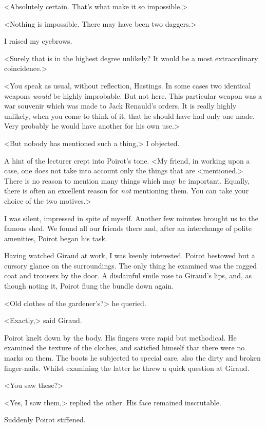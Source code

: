  <Absolutely certain. That's what make it so impossible.> 

 <Nothing is impossible. There may have been two daggers.> 

 I raised my eyebrows. 

 <Surely that is in the highest degree unlikely? It would be a most extraordinary coincidence.> 

 <You speak as usual, without reflection, Hastings. In some cases two identical weapons \emph{would} be highly improbable. But not here. This particular weapon was a war souvenir which was made to Jack Renauld's orders. It is really highly unlikely, when you come to think of it, that he should have had only one made. Very probably he would have another for his own use.> 

 <But nobody has mentioned such a thing,> I objected. 

 A hint of the lecturer crept into Poirot's tone. <My friend, in working upon a case, one does not take into account only the things that are <mentioned.> There is no reason to mention many things which may be important. Equally, there is often an excellent reason for \emph{not} mentioning them. You can take your choice of the two motives.> 

 I was silent, impressed in spite of myself. Another few minutes brought us to the famous shed. We found all our friends there and, after an interchange of polite amenities, Poirot began his task. 

 Having watched Giraud at work, I was keenly interested. Poirot bestowed but a cursory glance on the surroundings. The only thing he examined was the ragged coat and trousers by the door. A disdainful smile rose to Giraud's lips, and, as though noting it, Poirot flung the bundle down again. 

 <Old clothes of the gardener's?> he queried. 

 <Exactly,> said Giraud. 

 Poirot knelt down by the body. His fingers were rapid but methodical. He examined the texture of the clothes, and satisfied himself that there were no marks on them. The boots he subjected to special care, also the dirty and broken finger-nails. Whilst examining the latter he threw a quick question at Giraud. 

 <You saw these?> 

 <Yes, I saw them,> replied the other. His face remained inscrutable. 

 Suddenly Poirot stiffened. 

